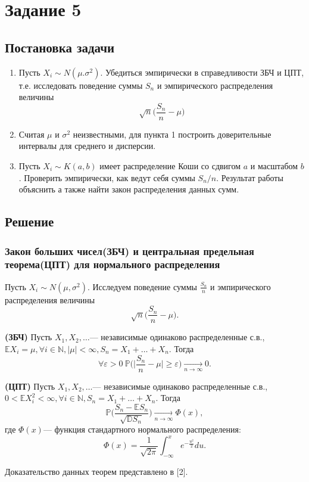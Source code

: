 \documentclass[11pt]{article}
\begin{document}
\section{Задание 5}
\subsection{Постановка задачи}
\begin{enumerate}
	\item Пусть $X_i \sim N(\mu. \sigma^2)$. Убедиться эмпирически в справедливости ЗБЧ и ЦПТ, т.е. исследовать поведение суммы $S_n$ и эмпирического распределения величины
	\[ \sqrt{n}\bigg( \frac{S_n}{n} - \mu \bigg) \]
	\item Считая $\mu$ и $\sigma^2$ неизвестными, для пункта 1 построить доверительные интервалы для среднего и дисперсии.
	\item  Пусть $X_i \sim K(a,b)$ имеет распределение Коши со сдвигом $a$ и масштабом $b$. Проверить эмпирически, как ведут себя суммы $S_n/n$. Результат работы объяснить а также найти закон распределения данных сумм. 
\end{enumerate} 

\subsection{Решение}
\subsubsection{Закон больших чисел(ЗБЧ) и центральная предельная теорема(ЦПТ) для нормального распределения}
Пусть $X_i \sim N(\mu, \sigma^2).$ Исследуем поведение суммы $\frac{S_n}{n}$ и эмпирического распределения величины
\[  \sqrt{n}\bigg( \frac{S_n}{n} - \mu \bigg). \] 
\begin{theorem}
	\textbf{(ЗБЧ)} Пусть $X_1,X_2,\dots$--- независимые одинаково распределенные с.в., $\mathbb{E}X_i = \mu, \forall i \in \mathbb{N}, |\mu| < \infty, S_n = X_1 + \dots + X_n.$ Тогда
	\[ \forall \varepsilon > 0 \ \mathbb{P}\bigg( \bigg|\frac{S_n}{n} - \mu\bigg| \geq \varepsilon \bigg) \underset{n \rightarrow \infty}{\longrightarrow} 0. \]
\end{theorem}
\begin{theorem}
	\textbf{(ЦПТ)} Пусть $X_1,X_2,\dots$--- независимые одинаково распределенные с.в., $0 < \mathbb{E}X_i^2 < \infty, \forall i \in \mathbb{N}, S_n = X_1 + \dots + X_n.$ Тогда
	\[ \mathbb{P}\bigg(\frac{S_n - \mathbb{E}S_n}{\sqrt{\mathbb{D}S_n}}\bigg) \underset{n \rightarrow \infty}{\longrightarrow} \Phi(x), \]
	где $\Phi(x)$--- функция стандартного нормального распределения:
	\[ \Phi(x) = \frac{1}{\sqrt{2\pi}}\int_{-\infty}^{x}e^{-\frac{u^2}{2}}du. \]  
\end{theorem}
Доказательство данных теорем представлено в [2].
\end{document}
